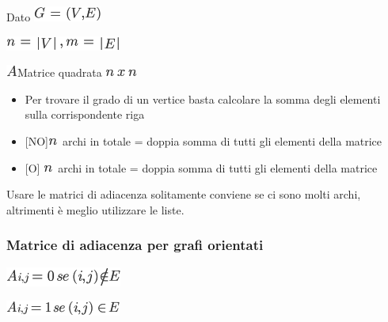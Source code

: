 \documentclass{article}
\providecommand{\tightlist}{%
  \setlength{\itemsep}{0pt}\setlength{\parskip}{0pt}}
\begin{document}
{Dato }\includegraphics{images/image335.png}{~}

\includegraphics{images/image376.png}

\includegraphics{images/image73.png}{Matrice quadrata
}\includegraphics{images/image385.png}

\begin{itemize}
\tightlist
\item
  {Per trovare il grado di un vertice basta calcolare la somma degli
  elementi sulla corrispondente riga}
\item
  {{[}NO{]}}\includegraphics{images/image41.png}{~archi in totale =
  doppia somma di tutti gli elementi della matrice}
\item
  {{[}O{]} }\includegraphics{images/image41.png}{~archi in totale =
  doppia somma di tutti gli elementi della matrice}
\end{itemize}

{}

{Usare le matrici di adiacenza solitamente conviene se ci sono molti
archi, altrimenti è meglio utilizzare le liste.}

\hypertarget{h.30h8k4akc7l}{\subsubsection{\texorpdfstring{{Matrice di
adiacenza per grafi
orientati}}{Matrice di adiacenza per grafi orientati}}\label{h.30h8k4akc7l}}

\includegraphics{images/image386.png}

\includegraphics{images/image387.png}
\end{document}
